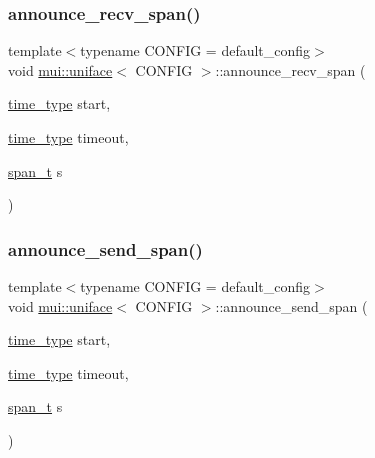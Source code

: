 \subsubsection{\texorpdfstring{announce\+\_\+recv\+\_\+span()}{announce\_recv\_span()}}
{\footnotesize\ttfamily template$<$typename C\+O\+N\+F\+IG  = default\+\_\+config$>$ \\
void \hyperlink{classmui_1_1uniface}{mui\+::uniface}$<$ C\+O\+N\+F\+IG $>$\+::announce\+\_\+recv\+\_\+span (\begin{DoxyParamCaption}\item[{\hyperlink{classmui_1_1uniface_a65cbecf1936d7d61cb45f14b1138dc07}{time\+\_\+type}}]{start,  }\item[{\hyperlink{classmui_1_1uniface_a65cbecf1936d7d61cb45f14b1138dc07}{time\+\_\+type}}]{timeout,  }\item[{\hyperlink{classmui_1_1uniface_a9aeea388b73b17bdc634eb1c96cbfeff}{span\+\_\+t}}]{s }\end{DoxyParamCaption})\hspace{0.3cm}{\ttfamily [inline]}}

\mbox{\label{classmui_1_1uniface_a342edf8b81f133d1dc5cc7bb6bb76e52}} 
\subsubsection{\texorpdfstring{announce\+\_\+send\+\_\+span()}{announce\_send\_span()}}
{\footnotesize\ttfamily template$<$typename C\+O\+N\+F\+IG  = default\+\_\+config$>$ \\
void \hyperlink{classmui_1_1uniface}{mui\+::uniface}$<$ C\+O\+N\+F\+IG $>$\+::announce\+\_\+send\+\_\+span (\begin{DoxyParamCaption}\item[{\hyperlink{classmui_1_1uniface_a65cbecf1936d7d61cb45f14b1138dc07}{time\+\_\+type}}]{start,  }\item[{\hyperlink{classmui_1_1uniface_a65cbecf1936d7d61cb45f14b1138dc07}{time\+\_\+type}}]{timeout,  }\item[{\hyperlink{classmui_1_1uniface_a9aeea388b73b17bdc634eb1c96cbfeff}{span\+\_\+t}}]{s }\end{DoxyParamCaption})\hspace{0.3cm}{\ttfamily [inline]}}

